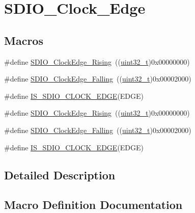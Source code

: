 \hypertarget{group___s_d_i_o___clock___edge}{}\section{S\+D\+I\+O\+\_\+\+Clock\+\_\+\+Edge}
\label{group___s_d_i_o___clock___edge}
\subsection*{Macros}
\begin{DoxyCompactItemize}
\item 
\#define \hyperlink{group___s_d_i_o___clock___edge_ga6d0f902037762a3048d95303c0037313}{S\+D\+I\+O\+\_\+\+Clock\+Edge\+\_\+\+Rising}~((\hyperlink{_p_e___types_8h_a33594304e786b158f3fb30289278f5af}{uint32\+\_\+t})0x00000000)
\item 
\#define \hyperlink{group___s_d_i_o___clock___edge_ga7be68024e3e2fe1994def85bc944189b}{S\+D\+I\+O\+\_\+\+Clock\+Edge\+\_\+\+Falling}~((\hyperlink{_p_e___types_8h_a33594304e786b158f3fb30289278f5af}{uint32\+\_\+t})0x00002000)
\item 
\#define \hyperlink{group___s_d_i_o___clock___edge_ga63420b10a52e3d82a89a45f20dc41786}{I\+S\+\_\+\+S\+D\+I\+O\+\_\+\+C\+L\+O\+C\+K\+\_\+\+E\+D\+GE}(E\+D\+GE)
\item 
\#define \hyperlink{group___s_d_i_o___clock___edge_ga6d0f902037762a3048d95303c0037313}{S\+D\+I\+O\+\_\+\+Clock\+Edge\+\_\+\+Rising}~((\hyperlink{_p_e___types_8h_a33594304e786b158f3fb30289278f5af}{uint32\+\_\+t})0x00000000)
\item 
\#define \hyperlink{group___s_d_i_o___clock___edge_ga7be68024e3e2fe1994def85bc944189b}{S\+D\+I\+O\+\_\+\+Clock\+Edge\+\_\+\+Falling}~((\hyperlink{_p_e___types_8h_a33594304e786b158f3fb30289278f5af}{uint32\+\_\+t})0x00002000)
\item 
\#define \hyperlink{group___s_d_i_o___clock___edge_ga63420b10a52e3d82a89a45f20dc41786}{I\+S\+\_\+\+S\+D\+I\+O\+\_\+\+C\+L\+O\+C\+K\+\_\+\+E\+D\+GE}(E\+D\+GE)
\end{DoxyCompactItemize}


\subsection{Detailed Description}


\subsection{Macro Definition Documentation}
